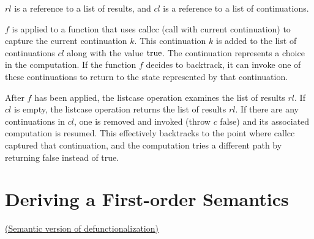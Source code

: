 \begin{enumcirc}
	\begin{enumrm}
		\item
		$\textit{rl}$ is a reference to a list of results, and $\textit{cl}$ is a reference to a list of continuations.
		\item
		$f$ is applied to a function that uses callcc (call with current continuation) to capture the current continuation $k$.
		This continuation $k$ is added to the list of continuations $\textit{cl}$ along
		with the value $\textrm{true}$.
		The continuation represents a choice in the computation.
		If the function $f$ decides to backtrack, it can invoke one of these
		continuations to return to the state represented by that continuation.
		\item
		After $f$ has been applied, the listcase operation examines the list of results
		$\textit{rl}$.
		If $\textit{cl}$ is empty, the listcase operation returns the list of results
		$\textit{rl}$.
		If there are any continuations in $\textit{cl}$, one is removed and invoked
		(throw $c$ false) and its associated computation is resumed.
		This effectively backtracks to the point where callcc captured that
		continuation, and the computation tries a different path by returning false
		instead of true.
	\end{enumrm}

\end{enumcirc}

\section{Deriving a First-order Semantics}

\ul{(Semantic version of defunctionalization)}

